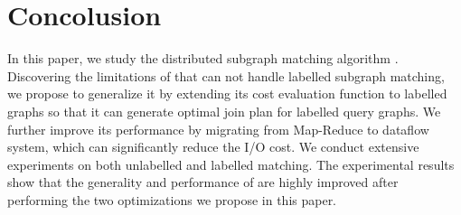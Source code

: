 \section{Concolusion}
\label{sec:conclusion}
In this paper, we study the distributed subgraph matching algorithm \cliquejoin. Discovering the limitations of \cliquejoin that can not handle labelled subgraph matching, we propose \gencliqjoin to generalize it by extending its cost evaluation function to labelled graphs so that it can generate optimal join plan for labelled query graphs. We further improve its performance by migrating \cliquejoin from Map-Reduce to \timely dataflow system, which can significantly reduce the I/O cost. We conduct extensive experiments on both unlabelled and labelled matching. The experimental results show that the generality and performance of \cliquejoin are highly improved after performing the two optimizations we propose in this paper.